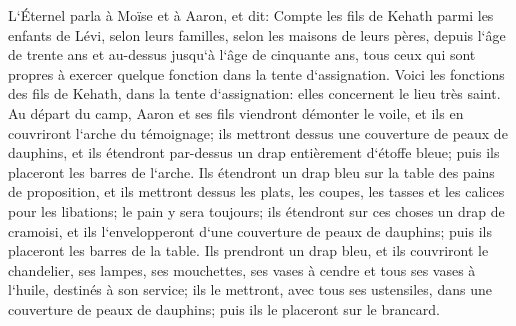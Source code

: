 \verse L`Éternel parla à Moïse et à Aaron, et dit: 
\verse Compte les fils de Kehath parmi les enfants de Lévi, selon leurs familles, selon les maisons de leurs pères, 
\verse depuis l`âge de trente ans et au-dessus jusqu`à l`âge de cinquante ans, tous ceux qui sont propres à exercer quelque fonction dans la tente d`assignation. 
\verse Voici les fonctions des fils de Kehath, dans la tente d`assignation: elles concernent le lieu très saint. 
\verse Au départ du camp, Aaron et ses fils viendront démonter le voile, et ils en couvriront l`arche du témoignage; 
\verse ils mettront dessus une couverture de peaux de dauphins, et ils étendront par-dessus un drap entièrement d`étoffe bleue; puis ils placeront les barres de l`arche. 
\verse Ils étendront un drap bleu sur la table des pains de proposition, et ils mettront dessus les plats, les coupes, les tasses et les calices pour les libations; le pain y sera toujours; 
\verse ils étendront sur ces choses un drap de cramoisi, et ils l`envelopperont d`une couverture de peaux de dauphins; puis ils placeront les barres de la table. 
\verse Ils prendront un drap bleu, et ils couvriront le chandelier, ses lampes, ses mouchettes, ses vases à cendre et tous ses vases à l`huile, destinés à son service; 
\verse ils le mettront, avec tous ses ustensiles, dans une couverture de peaux de dauphins; puis ils le placeront sur le brancard. 
